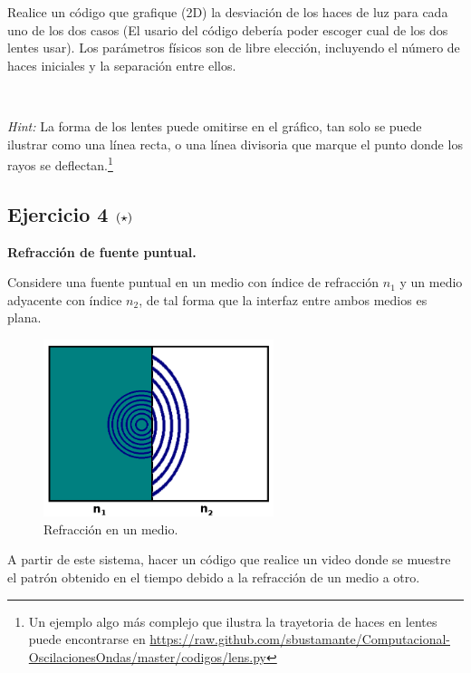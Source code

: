 Realice un código que grafique (2D) la desviación de los haces de luz para 
cada uno de los dos casos (El usario del código debería poder escoger cual 
de los dos lentes usar). Los parámetros físicos son de libre elección, 
incluyendo el número de haces iniciales y la separación entre ellos. 

\

\textit{Hint:} La forma de los lentes puede omitirse en el gráfico, tan 
solo se puede ilustrar como una línea recta, o una línea divisoria que
marque el punto donde los rayos se deflectan.\footnote{Un ejemplo algo más
complejo que ilustra la trayetoria de haces en lentes puede encontrarse
en \url{https://raw.github.com/sbustamante/Computacional-OscilacionesOndas/master/codigos/lens.py}}



\newpage
\subsection*{Ejercicio 4 \large{$\left( \star \right)$}}

\textbf{Refracción de fuente puntual.}

Considere una fuente puntual en un medio con índice de refracción $n_1$ y 
un medio adyacente con índice $n_2$, de tal forma que la interfaz entre ambos
medios es plana. 

\begin{figure}[htbp]
	\centering
	\includegraphics[width=0.60\textwidth]
	{./pictures/difraction.png}

	\caption{\small{Refracción en un medio.}}
	
	\label{fig:two_medias}
\end{figure}

A partir de este sistema, hacer un código que realice un video donde se
muestre el patrón obtenido en el tiempo debido a la refracción de un medio a
otro. 

